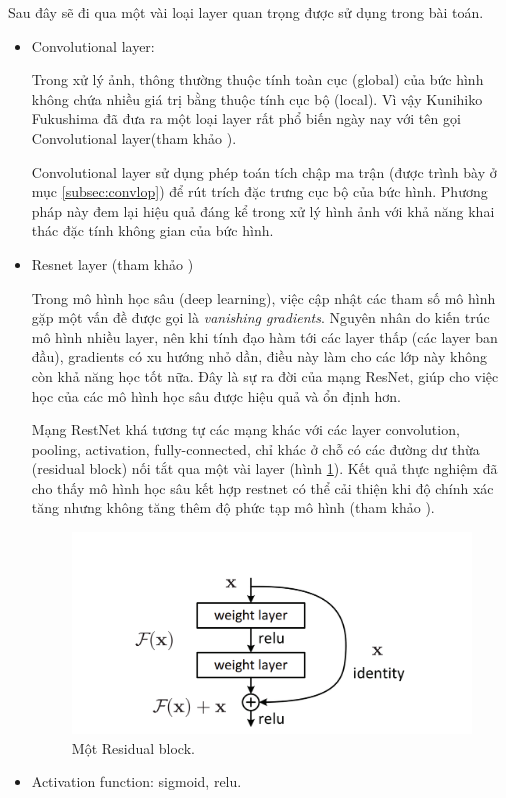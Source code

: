 Sau đây sẽ đi qua một vài loại layer quan trọng được sử dụng trong bài toán.
\begin{itemize}
    \item Convolutional layer:

          Trong xử lý ảnh, thông thường thuộc tính toàn cục (global) của bức hình không chứa nhiều giá trị bằng thuộc tính cục bộ (local). Vì vậy Kunihiko Fukushima đã đưa ra một loại layer rất phổ biến ngày nay với tên gọi Convolutional  layer(tham khảo \cite{fukushima1988neocognitron}).

          Convolutional layer sử dụng phép toán tích chập ma trận (được trình bày ở mục \ref{subsec:convlop}) để rút trích đặc trưng cục bộ của bức hình. Phương pháp này đem lại hiệu quả đáng kể trong xử lý hình ảnh với khả năng khai thác đặc tính không gian của bức hình.

    \item Resnet layer (tham khảo \cite{he2016deep})

          Trong mô hình học sâu (deep learning), việc cập nhật các tham số mô hình gặp một vấn đề được gọi là \textit{vanishing gradients}. Nguyên nhân do kiến trúc mô hình nhiều layer, nên khi tính đạo hàm tới các layer thấp (các layer ban đầu), gradients có xu hướng nhỏ dần, điều này làm cho các lớp này không còn khả năng học tốt nữa. Đây là sự ra đời của mạng ResNet, giúp cho việc học của các mô hình học sâu được hiệu quả và ổn định hơn.

          Mạng RestNet khá tương tự các mạng khác với các layer convolution, pooling, activation, fully-connected, chỉ khác ở chỗ có các đường dư thừa (residual block) nối tắt qua một vài layer (hình \ref{fig:restnet}). Kết quả thực nghiệm đã cho thấy mô hình học sâu kết hợp restnet có thể cải thiện khi độ chính xác tăng nhưng không tăng thêm độ phức tạp mô hình (tham khảo \cite{he2016deep}).

          \begin{figure}[t]
              \begin{center}
                  \includegraphics[scale=0.2]{asset/image/restnet.png}
                  \caption{Một Residual block. }
                  \label{fig:restnet}
              \end{center}
          \end{figure}
    \item Activation function: sigmoid, relu.


\end{itemize}
